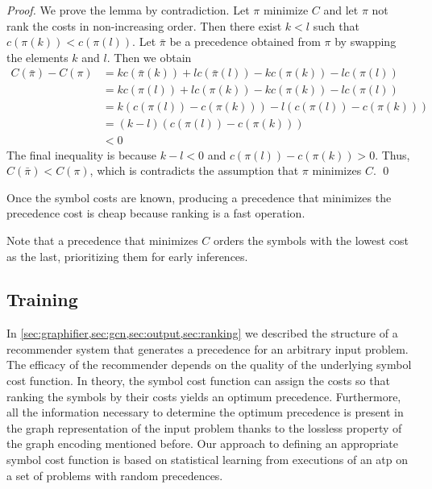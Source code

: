 \begin{proof}
We prove the lemma by contradiction.
Let $\pi$ minimize $C$ and let $\pi$ not rank the costs in non-increasing order.
Then there exist $k < l$ such that $c(\pi(k)) < c(\pi(l))$.
Let $\bar{\pi}$ be a precedence obtained from $\pi$ by swapping the elements $k$ and $l$.
Then we obtain
\begin{align*}
C(\bar{\pi}) - C(\pi)
&= kc(\bar{\pi}(k)) + lc(\bar{\pi}(l)) - kc(\pi(k)) - lc(\pi(l)) \\
&= kc(\pi(l)) + lc(\pi(k)) - kc(\pi(k)) - lc(\pi(l)) \\
&= k(c(\pi(l)) - c(\pi(k))) - l(c(\pi(l)) - c(\pi(k))) \\
&= (k-l) (c(\pi(l)) - c(\pi(k))) \\
&< 0
\end{align*}
The final inequality is because $k-l < 0$ and $c(\pi(l)) - c(\pi(k)) > 0$.
Thus, $C(\bar{\pi}) < C(\pi)$, which is contradicts the assumption that $\pi$ minimizes $C$. \qed
\end{proof}

Once the symbol costs are known,
producing a precedence that minimizes the precedence cost is cheap
because ranking is a fast operation.

Note that a precedence that minimizes $C$
orders the symbols with the lowest cost as the last, prioritizing them for early inferences.


\subsection{Training}

In \cref{sec:graphifier,sec:gcn,sec:output,sec:ranking} we described the structure of a recommender system that generates a precedence for an arbitrary input problem.
The efficacy of the recommender depends on the quality of the underlying symbol cost function.
In theory, the symbol cost function can assign the costs so that
ranking the symbols by their costs yields an optimum precedence.
Furthermore, all the information necessary to determine the optimum precedence is present in the graph representation of the input problem
thanks to the lossless property of the graph encoding mentioned before.
Our approach to defining an appropriate symbol cost function is based on statistical learning
from executions of an \gls{atp} on a set of problems with random precedences.


